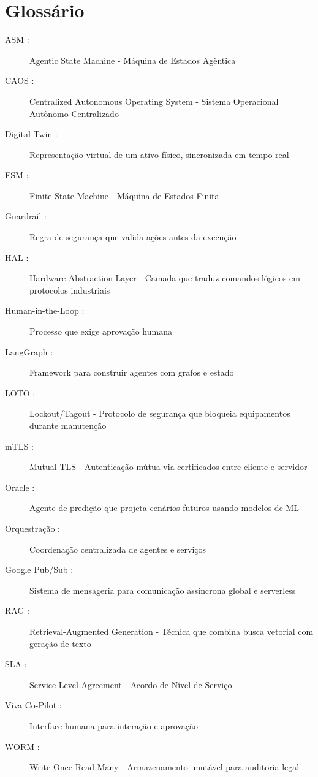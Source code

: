 \documentclass[12pt, a4paper]{article}
\begin{document}
\section*{Glossário} 
\begin{description} 
    \item[ASM :] Agentic State Machine - Máquina de Estados Agêntica
    \item[CAOS :] Centralized Autonomous Operating System - Sistema Operacional Autônomo Centralizado
    \item[Digital Twin :] Representação virtual de um ativo físico, sincronizada em tempo real
    \item[FSM :] Finite State Machine - Máquina de Estados Finita
    \item[Guardrail :] Regra de segurança que valida ações antes da execução
    \item[HAL :] Hardware Abstraction Layer - Camada que traduz comandos lógicos em protocolos industriais
    \item[Human-in-the-Loop :] Processo que exige aprovação humana
    \item[LangGraph :] Framework para construir agentes com grafos e estado
    \item[LOTO :] Lockout/Tagout - Protocolo de segurança que bloqueia equipamentos durante manutenção
    \item[mTLS :] Mutual TLS - Autenticação mútua via certificados entre cliente e servidor
    \item[Oracle :] Agente de predição que projeta cenários futuros usando modelos de ML
    \item[Orquestração :] Coordenação centralizada de agentes e serviços
    \item[Google Pub/Sub :] Sistema de mensageria para comunicação assíncrona global e serverless
    \item[RAG :] Retrieval-Augmented Generation - Técnica que combina busca vetorial com geração de texto
    \item[SLA :] Service Level Agreement - Acordo de Nível de Serviço
    \item[Viva Co-Pilot :] Interface humana para interação e aprovação
    \item[WORM :] Write Once Read Many - Armazenamento imutável para auditoria legal
\end{description}
\newpage

\end{document}
